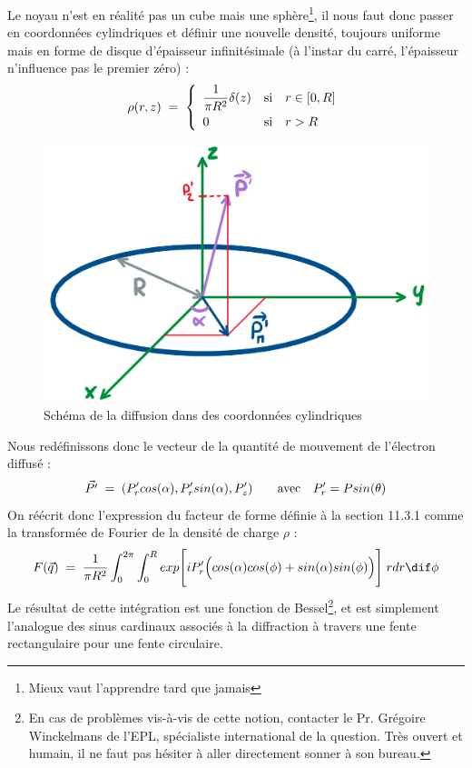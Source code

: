 Le noyau n'est en réalité pas un cube mais une sphère\footnote{Mieux vaut l'apprendre tard que jamais}, il nous faut donc passer en coordonnées cylindriques et définir une nouvelle densité, toujours uniforme mais en forme de disque d'épaisseur infinitésimale (à l'instar du carré, l'épaisseur n'influence pas le premier zéro) :
    \begin{equation*}
        \rho(r,z) \; = \;
        \left\{
        \begin{array}{lll}
            \dfrac{1}{\pi R^2} \delta(z) &  \text{si} & r \in [0,R]\\[7pt]
            0 & \text{si} & r > R 
        \end{array}
        \right.
    \end{equation*}
     \begin{figure}[H]
    \centering
    \includegraphics[scale=.4]{Images4/noyau_disque.png}
    \caption{Schéma de la diffusion dans des coordonnées cylindriques}
    \label{fig:Schéma coordonnées sphériques}
\end{figure}
Nous redéfinissons donc le vecteur de la quantité de mouvement de l'électron diffusé :
\begin{equation*}
    \vec{P'} \; = \; (P'_r cos(\alpha), P'_r sin(\alpha), P'_z)
    \qquad \text{avec} \quad P'_r = P sin(\theta)
\end{equation*}
On réécrit donc l'expression du facteur de forme définie à la section 11.3.1 comme la transformée de Fourier de la densité de charge $\rho$ :
\begin{equation*}
    F(\vec{q}) \eq \dfrac{1}{\pi R^2}\int_0^{2\pi} \int_0^R exp\Bigg[ iP'_r \Big(cos(\alpha)cos(\phi) + sin(\alpha)sin(\phi) \Big) \Bigg] \; r dr \dif\phi
\end{equation*}
Le résultat de cette intégration est une fonction de Bessel\footnote{En cas de problèmes vis-à-vis de cette notion, contacter le Pr. Grégoire Winckelmans de l'EPL, spécialiste international de la question. Très ouvert et humain, il ne faut pas hésiter à aller directement sonner à son bureau.}, et est simplement l'analogue des sinus cardinaux associés à la diffraction à travers une fente rectangulaire pour une fente circulaire.

